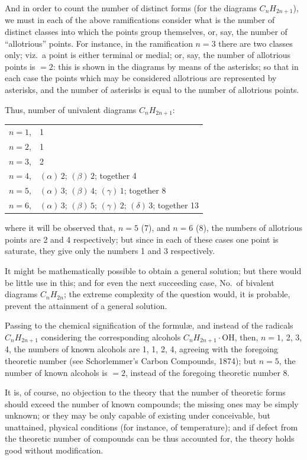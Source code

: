 \documentclass[11pt,a4paper]{book}
\begin{document}
And in order to count the number of distinct forms (for the diagrams $C_n H_{2n+1}$), we must in each of the above ramifications consider what is the number of distinct classes into which the points group themselves, or, say, the number of ``allotrious'' points. For instance, in the ramification $n = 3$ there are two classes only; viz.\ a point is either terminal or medial; or, say, the number of allotrious points is $= 2$: this is shown in the diagrams by means of the asterisks; so that in each case the points which may be considered allotrious are represented by asterisks, and the number of asterisks is equal to the number of allotrious points.

Thus, number of univalent diagrams $C_n H_{2n+1}$:
\begin{center}
\begin{tabular}{ll}
$n = 1$, & 1 \\
$n = 2$, & 1 \\
$n = 3$, & 2 \\
$n = 4$, & $(\alpha)\, 2$; $(\beta)\, 2$; together 4 \\
$n = 5$, & $(\alpha)\, 3$; $(\beta)\, 4$; $(\gamma)\, 1$; together 8 \\
$n = 6$, & $(\alpha)\, 3$; $(\beta)\, 5$; $(\gamma)\, 2$; $(\delta)\, 3$; together 13
\end{tabular}
\end{center}

where it will be observed that, $n = 5$ (7), and $n = 6$ (8), the numbers of allotrious points are 2 and 4 respectively; but since in each of these cases one point is saturate, they give only the numbers 1 and 3 respectively.

It might be mathematically possible to obtain a general solution; but there would be little use in this; and for even the next succeeding case, No.\ of bivalent diagrams $C_n H_{2n}$; the extreme complexity of the question would, it is probable, prevent the attainment of a general solution.

Passing to the chemical signification of the formul\ae, and instead of the radicals $C_n H_{2n+1}$ considering the corresponding alcohols $C_n H_{2n+1} \cdot \mathrm{OH}$, then, $n = 1$, 2, 3, 4, the numbers of known alcohols are 1, 1, 2, 4, agreeing with the foregoing theoretic number (see Schorlemmer's Carbon Compounds, 1874); but $n = 5$, the number of known alcohols is $= 2$, instead of the foregoing theoretic number 8.

It is, of course, no objection to the theory that the number of theoretic forms should exceed the number of known compounds; the missing ones may be simply unknown; or they may be only capable of existing under conceivable, but unattained, physical conditions (for instance, of temperature); and if defect from the theoretic number of compounds can be thus accounted for, the theory holds good without modification.
\end{document}
